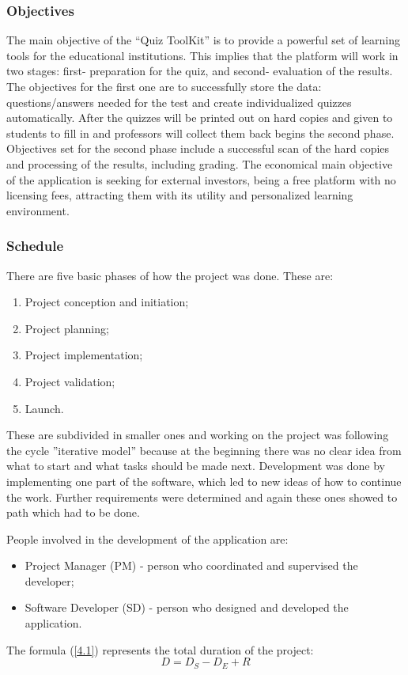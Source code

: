 \subsubsection{Objectives}
The main objective of the “Quiz ToolKit” is to provide a powerful set of learning tools for the educational institutions. This implies that the platform will work in two stages: first- preparation for the quiz, and second- evaluation of the results. The objectives for the first one are to successfully store the data: questions/answers needed for the test and create individualized quizzes automatically. After the quizzes will be printed out on hard copies and given to students to fill in and professors will collect them back begins the second phase. Objectives set for the second phase include a successful scan of the hard copies and processing of the results, including grading. 
The economical main objective of the application is seeking for external investors, being a free platform with no licensing fees, attracting them with its utility and personalized learning environment. 

\subsubsection{Schedule}
There are five basic phases of how the project was done. These are:
\begin{enumerate}
  \item Project conception and initiation;
  \item Project planning;
  \item Project implementation;
  \item Project validation; 
  \item Launch. 
\end{enumerate}
These are subdivided in smaller ones and working on the project was following the cycle ”iterative model” because at the beginning there was no clear idea from what to start and what tasks should be made next. Development was done by implementing one part of the software, which led to new ideas of how to continue the work. Further requirements were determined and again these ones showed to path which had to be done. 

People involved in the development of the application are:
\begin{itemize}
  \item Project Manager (PM) - person who coordinated and supervised the developer; 
  \item Software Developer (SD) - person who designed and developed the application. 
\end{itemize}
The formula (\ref{4.1}) represents the total duration of the project:
\begin{equation}
D = D_{S} - D_{E} + R  \label{4.1}
\end{equation}

